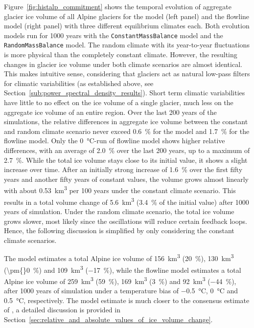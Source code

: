         Figure~\ref{fig:histalp_commitment} shows the temporal evolution of aggregate glacier ice volume of all Alpine glaciers for the \vas{} model (left panel) and the flowline model (right panel) with three different equilibrium climates each. Both evolution models run for 1000 years with the \lstinline`ConstantMassBalance` model and the \lstinline`RandomMassBalance` model. The random climate with its year-to-year fluctuations is more physical than the completely constant climate. However, the resulting changes in glacier ice volume under both climate scenarios are almost identical. This makes intuitive sense, considering that glaciers act as natural low-pass filters for climatic variabilities (as established above, see Section~\ref{sub:power_spectral_density_results}). Short term climatic variabilities have little to no effect on the ice volume of a single glacier, much less on the aggregate ice volume of an entire region. Over the last 200 years of the simulations, the relative differences in aggregate ice volume between the constant and random climate scenario never exceed \SI{0.6}{\percent} for the \vas{} model and \SI{1.7}{\percent} for the flowline model. Only the \SI{0}{\celsius}-run of flowline model shows higher relative differences, with an average of \SI{2.0}{\percent} over the last 200 years, up to a maximum of \SI{2.7}{\percent}. While the total ice volume stays close to its initial value, it shows a slight increase over time. After an initially strong increase of \SI{1.6}{\percent} over the first fifty years and another fifty years of constant values, the volume grows almost linearly with about \SI{0.53}{\cubic\kilo\meter} per 100 years under the constant climate scenario. This results in a total volume change of \SI{5.6}{\cubic\kilo\meter} (\SI{+3.4}{\percent} of the initial value) after 1000 years of simulation. Under the random climate scenario, the total ice volume grows slower, most likely since the oscillations will reduce certain feedback loops. Hence, the following discussion is simplified by only considering the constant climate scenarios. 

        The \vas{} model estimates a total Alpine ice volume of \SI{156}{\cubic\kilo\meter} (\SI{+20}{\percent}), \SI{130}{\cubic\kilo\meter} (\SI{\pm{}0}{\percent}) and \SI{109}{\cubic\kilo\meter} (\SI{-17}{\percent}), while the flowline model estimates a total Alpine ice volume of \SI{259}{\cubic\kilo\meter} (\SI{+59}{\percent}), \SI{169}{\cubic\kilo\meter} (\SI{+3}{\percent}) and \SI{92}{\cubic\kilo\meter} (\SI{-44}{\percent}), after 1000 years of simulation under a temperature bias of \SI{-0.5}{\celsius}, \SI{0}{\celsius} and \SI{+0.5}{\celsius}, respectively. The \vas{} model estimate is much closer to the consensus estimate of \citet{Farinotti2019}, a detailed discussion is provided in Section~\ref{sec:relative_and_absolute_values_of_ice_volume_change}.

